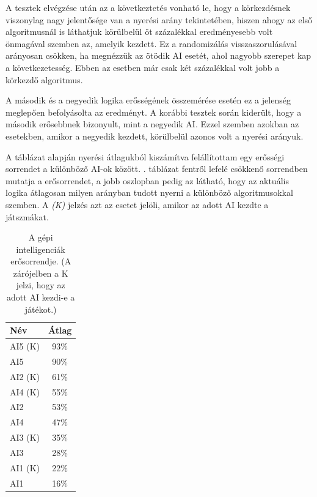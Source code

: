 A tesztek elvégzése után az a következtetés vonható le, hogy a körkezdésnek viszonylag nagy jelentősége van a nyerési arány tekintetében, hiszen ahogy az első algoritmusnál is láthatjuk körülbelül öt százalékkal eredményesebb volt önmagával szemben az, amelyik kezdett. Ez a randomizálás visszaszorulásával arányosan csökken, ha megnézzük az ötödik AI esetét, ahol nagyobb szerepet kap a következetesség. Ebben az esetben már csak két százalékkal volt jobb a körkezdő algoritmus.

A második és a negyedik logika erősségének összemérése esetén ez a jelenség meglepően befolyásolta az eredményt. A korábbi tesztek során kiderült, hogy a második erősebbnek bizonyult, mint a negyedik AI. Ezzel szemben azokban az esetekben, amikor a negyedik kezdett, körülbelül azonos volt a nyerési arányuk.

A táblázat alapján nyerési átlagukból kiszámítva felállítottam egy erősségi sorrendet a különböző AI-ok között. . táblázat fentről lefelé csökkenő sorrendben mutatja a erősorrendet, a jobb oszlopban pedig az látható, hogy az aktuális logika átlagosan milyen arányban tudott nyerni a különböző algoritmusokkal szemben. A \textit{(K)} jelzés azt az esetet jelöli, amikor az adott AI kezdte a játszmákat.

\begin{table}[h]
\caption{A gépi intelligenciák erősorrendje. (A zárójelben a K jelzi, hogy az adott AI kezdi-e a játékot.)}
\label{tab:ai_ranking}
\medskip
\centering
\begin{tabular}{|l|c|} 
\hline
Név & Átlag \\
 \hline
 AI5 (K) & 93\%\\ 
 \hline
 AI5 & 90\%\\ 
 \hline
 AI2 (K) & 61\%\\ 
 \hline
 AI4 (K) & 55\%\\ 
 \hline
 AI2 & 53\%\\
 \hline
  AI4 & 47\%\\ 
 \hline
 AI3 (K) & 35\%\\ 
 \hline
 AI3 & 28\%\\ 
 \hline
 AI1 (K) & 22\%\\ 
 \hline
 AI1 & 16\%\\
 \hline
\end{tabular}
\end{table}